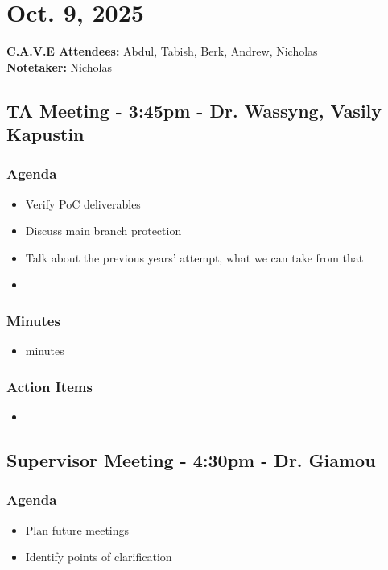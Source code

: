 	\pagebreak
	\section*{Oct. 9, 2025}

	\textbf{C.A.V.E Attendees:} Abdul, Tabish, Berk, Andrew, Nicholas\\
	\textbf{Notetaker:} Nicholas

	\subsection*{TA Meeting - 3:45pm - Dr. Wassyng, Vasily Kapustin}
		\subsubsection*{Agenda}
			\begin{itemize}
				\item Verify PoC deliverables
				\item Discuss main branch protection
				\item Talk about the previous years' attempt, what we can take from that
				\item 
			\end{itemize}

		\subsubsection*{Minutes}
			\begin{itemize}
				\item minutes
			\end{itemize}

		\subsubsection*{Action Items}
			\begin{itemize}
				\item
			\end{itemize}

	\subsection*{Supervisor Meeting - 4:30pm - Dr. Giamou}
		\subsubsection*{Agenda}
			\begin{itemize}
				\item Plan future meetings
				\item Identify points of clarification
			\end{itemize}

